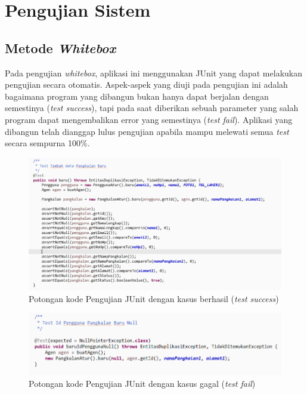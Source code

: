 \begin{enumerate}[a.]
	\end{enumerate}

	
	\section{Pengujian Sistem}
	
		\subsection{Metode \textit{Whitebox}}
			\par Pada pengujian \textit{whitebox}, aplikasi ini menggunakan JUnit yang dapat melakukan pengujian secara otomatis. Aspek-aspek yang diuji pada pengujian ini adalah bagaimana program yang dibangun bukan hanya dapat berjalan dengan semestinya (\textit{test success}), tapi pada saat diberikan sebuah parameter yang salah program dapat mengembalikan error yang semestinya (\textit{test fail}). Aplikasi yang dibangun telah dianggap lulus pengujian apabila mampu melewati semua \textit{test} secara sempurna 100\%. 
			
			\begin{figure}[H]
				\center
				\includegraphics [width = 14cm]{gambar/kode/test-success}
				\caption{Potongan kode Pengujian JUnit dengan kasus berhasil (\textit{test success})}
				\label{testSuccess}
			\end{figure}
		
			\begin{figure}[H]
				\center
				\includegraphics [width = 14cm]{gambar/kode/test-fail}
				\caption{Potongan kode Pengujian JUnit dengan kasus gagal (\textit{test fail})}
				\label{testFail}
			\end{figure}
		
